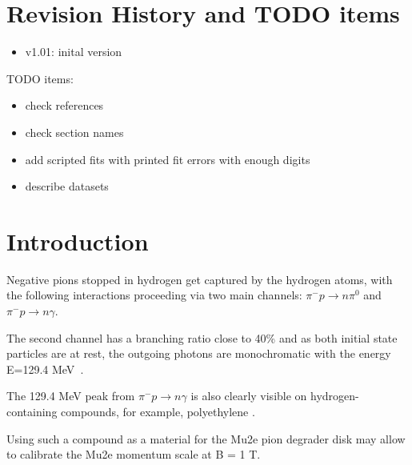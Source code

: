 \documentclass[12pt]{article}
\begin{document}
% 


\newpage
\section {Revision History and TODO items}

\begin{itemize}
\item
  v1.01: inital version
\end{itemize}

{\red
TODO items:

\begin{itemize}
\item
  check references
\item
  check section names
\item
  add scripted fits with printed fit errors with enough digits 
\item
  describe datasets
\end{itemize}
}
\newpage
\section {Introduction}
Negative pions stopped in hydrogen get captured by the hydrogen atoms, 
with the following interactions proceeding via two main channels:
$\pi^- p \to n\pi^0$ and $\pi^- p \to n \gamma$.

The second channel has a branching ratio close to 40\% and as both initial state particles
are at rest, the outgoing photons are monochromatic
with the energy E=129.4 MeV~\cite{RPC_1972_Bistirlich_PhysRevC.5.1867}.

The 129.4 MeV peak from $\pi^- p \to n \gamma$ is also clearly visible on hydrogen-containing
compounds, for example, polyethylene \cite{RPC_1972_Bistirlich_PhysRevC.5.1867}.

Using such a compound as a material for the Mu2e pion degrader disk may allow to calibrate
the Mu2e momentum scale at B = 1 T.
\end{document}
